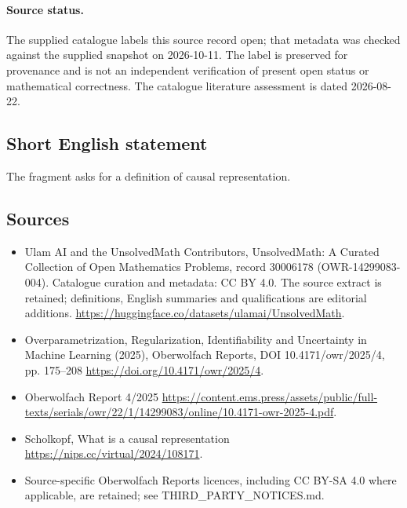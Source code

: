 \documentclass[11pt]{article}
\begin{document}
\paragraph{Source status.}
The supplied catalogue labels this source record open; that metadata was checked against the supplied snapshot on 2026-10-11. The label is preserved for provenance and is not an independent verification of present open status or mathematical correctness. The catalogue literature assessment is dated 2026-08-22.
\subsection{Short English statement}
The fragment asks for a definition of causal representation.
\subsection{Sources}
\begin{itemize}
\item[\hypertarget{source:30006178:1}{S1}] Ulam AI and the UnsolvedMath Contributors, UnsolvedMath: A Curated Collection of Open Mathematics Problems, record 30006178 (OWR-14299083-004). Catalogue curation and metadata: CC BY 4.0. The source extract is retained; definitions, English summaries and qualifications are editorial additions.
\url{https://huggingface.co/datasets/ulamai/UnsolvedMath}.
\item[\hypertarget{source:30006178:2}{S2}] Overparametrization, Regularization, Identifiability and Uncertainty in Machine Learning (2025), Oberwolfach Reports, DOI 10.4171/owr/2025/4, pp. 175--208
\url{https://doi.org/10.4171/owr/2025/4}.
\item[\hypertarget{source:30006178:3}{S3}] Oberwolfach Report 4/2025
\url{https://content.ems.press/assets/public/full-texts/serials/owr/22/1/14299083/online/10.4171-owr-2025-4.pdf}.
\item[\hypertarget{source:30006178:4}{S4}] Scholkopf, What is a causal representation
\url{https://nips.cc/virtual/2024/108171}.
\item Source-specific Oberwolfach Reports licences, including CC BY-SA 4.0 where applicable, are retained; see THIRD\_PARTY\_NOTICES.md.
\end{itemize}
\end{document}
